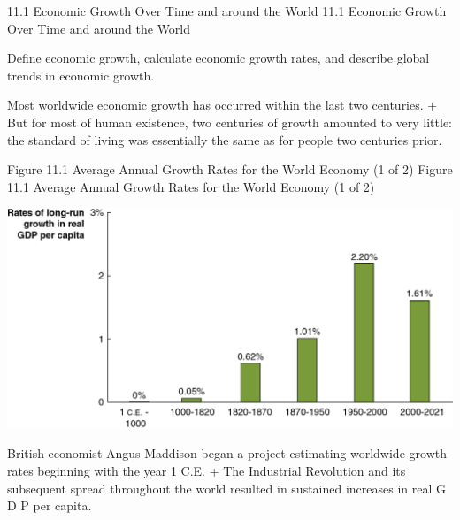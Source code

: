 \documentclass[
  12pt,
  ignorenonframetext,
]{beamer}
\begin{document}
\begin{frame}{11.1 Economic Growth Over Time and around the World}
\protect\hypertarget{economic-growth-over-time-and-around-the-world}{}
11.1 Economic Growth Over Time and around the World

Define economic growth, calculate economic growth rates, and describe
global trends in economic growth.

Most worldwide economic growth has occurred within the last two
centuries. + But for most of human existence, two centuries of growth
amounted to very little: the standard of living was essentially the same
as for people two centuries prior.
\end{frame}

\begin{frame}{Figure 11.1 Average Annual Growth Rates for the World
Economy (1 of 2)}
\protect\hypertarget{figure-11.1-average-annual-growth-rates-for-the-world-economy-1-of-2}{}
Figure 11.1 Average Annual Growth Rates for the World Economy (1 of 2)

\includegraphics[width=\textwidth,height=0.99\textheight]{imgs3/img_slide06a.png}

British economist Angus Maddison began a project estimating worldwide
growth rates beginning with the year 1 C.E. + The Industrial Revolution
and its subsequent spread throughout the world resulted in sustained
increases in real G D P per capita.
\end{frame}
\end{document}
